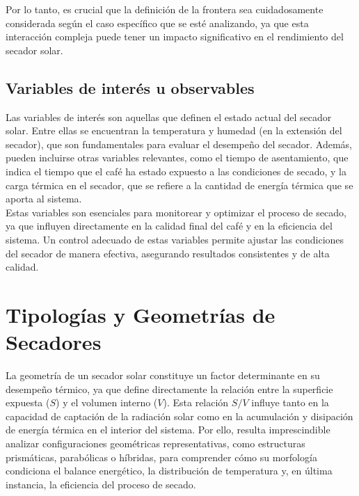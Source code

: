 \documentclass[12pt]{article}
\begin{document}
Por lo tanto, es crucial que la definición de la frontera sea cuidadosamente considerada según el caso específico que se esté analizando, ya que esta interacción compleja puede tener un impacto significativo en el rendimiento del secador solar.\\

\subsection{Variables de interés u observables}

Las variables de interés son aquellas que definen el estado actual del secador solar. Entre ellas se encuentran la temperatura y humedad (en la extensión del secador), que son fundamentales para evaluar el desempeño del secador. Además, pueden incluirse otras variables relevantes, como el tiempo de asentamiento, que indica el tiempo que el café ha estado expuesto a las condiciones de secado, y la carga térmica en el secador, que se refiere a la cantidad de energía térmica que se aporta al sistema.\\

Estas variables son esenciales para monitorear y optimizar el proceso de secado, ya que influyen directamente en la calidad final del café y en la eficiencia del sistema. Un control adecuado de estas variables permite ajustar las condiciones del secador de manera efectiva, asegurando resultados consistentes y de alta calidad.




\section{Tipologías y Geometrías de Secadores}

La geometría de un secador solar constituye un factor determinante en su desempeño térmico, ya que define directamente la relación entre la superficie expuesta ($S$) y el volumen interno ($V$). Esta relación $S/V$ influye tanto en la capacidad de captación de la radiación solar como en la acumulación y disipación de energía térmica en el interior del sistema. Por ello, resulta imprescindible analizar configuraciones geométricas representativas, como estructuras prismáticas, parabólicas o híbridas, para comprender cómo su morfología condiciona el balance energético, la distribución de temperatura y, en última instancia, la eficiencia del proceso de secado.
\end{document}
